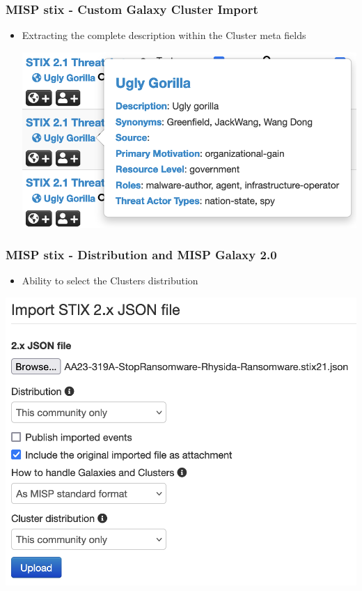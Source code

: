 \begin{frame}
     \frametitle{MISP stix - Custom Galaxy Cluster Import}
     \begin{itemize}
        \item Extracting the complete description within the Cluster meta fields
	\begin{center}
	   \includegraphics[scale=0.5]{stix-cluster3.png}
        \end{center}
     \end{itemize}
\end{frame}

\begin{frame}
     \frametitle{MISP stix - Distribution and MISP Galaxy 2.0}
     \begin{itemize}
        \item Ability to select the Clusters distribution
     \end{itemize}
	\begin{center}
	    \includegraphics[scale=0.5]{stix-cluster4.png}
	\end{center}
\end{frame}

